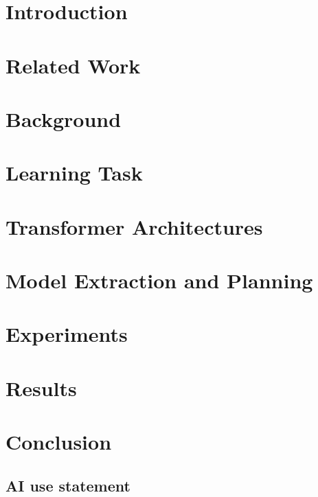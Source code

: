 \documentclass{article} %
\theoremstyle{definition}
\begin{document}
\section{Introduction}


\section{Related Work}


\section{Background}


\section{Learning Task}


\section{Transformer Architectures}


\section{Model Extraction and Planning}


\section{Experiments}


\section{Results}


\section{Conclusion}



\subsection*{AI use statement}
\end{document}
